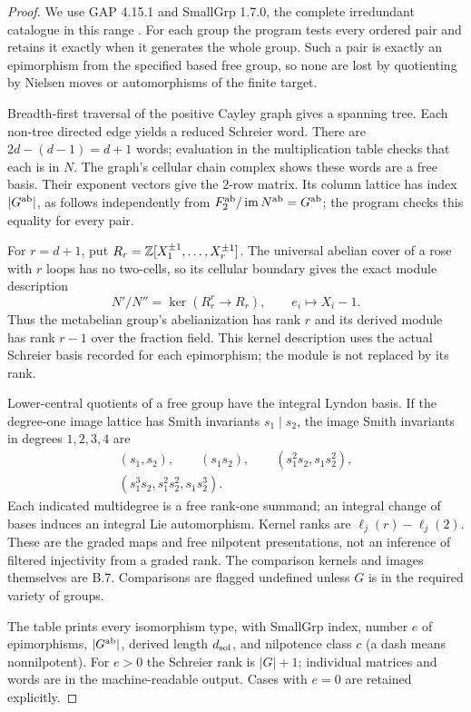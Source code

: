 \begin{proof}
We use GAP 4.15.1 and SmallGrp 1.7.0, the complete
irredundant catalogue in this range \citep{SmallGrp2025}.
For each group the program tests every ordered pair and
retains it exactly when it generates the whole group.
Such a pair is exactly an epimorphism from the specified
based free group, so none are lost by quotienting by
Nielsen moves or automorphisms of the finite target.

Breadth-first traversal of the positive Cayley graph gives a
spanning tree. Each non-tree directed edge yields a reduced
Schreier word. There are $2d-(d-1)=d+1$ words; evaluation in
the multiplication table checks that each is in $N$.
The graph's cellular chain complex shows these words are a
free basis. Their exponent vectors give the $2$-row matrix.
Its column lattice has index $|G^{\mathrm{ab}}|$, as follows
independently from $F_2^{\mathrm{ab}}/\operatorname{im} N^{\mathrm{ab}}=G^{\mathrm{ab}}$;
the program checks this equality for every pair.

For $r=d+1$, put $R_r=\mathbb Z[X_1^{\pm1},\ldots,X_r^{\pm1}]$.
The universal abelian cover of a rose with $r$ loops has no
two-cells, so its cellular boundary gives the exact module
description
\[
 N'/N''=\ker(R_r^r\longrightarrow R_r),
 \qquad e_i\longmapsto X_i-1.
\]
Thus the metabelian group's abelianization has rank $r$
and its derived module has rank $r-1$ over the fraction field.
This kernel description uses the actual Schreier basis recorded
for each epimorphism; the module is not replaced by its rank.

Lower-central quotients of a free group have the integral
Lyndon basis. If the degree-one image lattice has Smith
invariants $s_1\mid s_2$, the image Smith invariants in
degrees $1,2,3,4$ are
\[
\begin{gathered}
 (s_1,s_2),\qquad(s_1s_2),\qquad
 (s_1^2s_2,s_1s_2^2),\\
 (s_1^3s_2,s_1^2s_2^2,s_1s_2^3).
\end{gathered}
\]
Each indicated multidegree is a free rank-one summand;
an integral change of bases induces an integral Lie
automorphism. Kernel ranks are $\ell_j(r)-\ell_j(2)$.
These are the graded maps and free nilpotent presentations,
not an inference of filtered injectivity from a graded rank.
The comparison kernels and images themselves are B.7.
Comparisons are flagged undefined unless $G$ is in the
required variety of groups.

The table prints every isomorphism type, with SmallGrp
index, number $e$ of epimorphisms, $|G^{\mathrm{ab}}|$, derived
length $d_{\rm sol}$, and nilpotence class $c$ (a dash means
nonnilpotent). For $e>0$ the Schreier rank is $|G|+1$;
individual matrices and words are in the machine-readable
output. Cases with $e=0$ are retained explicitly.
\end{proof}


